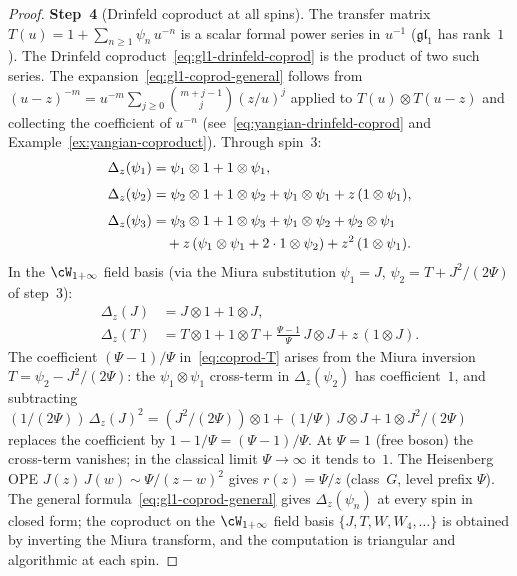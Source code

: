\begin{proof}
\medskip
\noindent
\textbf{Step~4}
(Drinfeld coproduct at all spins).
The transfer matrix
$T(u) = 1 + \sum_{n \geq 1} \psi_n\, u^{-n}$
is a scalar formal power series in $u^{-1}$
($\mathfrak{gl}_1$ has rank~$1$). The Drinfeld
coproduct~\eqref{eq:gl1-drinfeld-coprod} is the product
of two such series. The
expansion~\eqref{eq:gl1-coprod-general} follows from
$(u - z)^{-m} = u^{-m} \sum_{j \geq 0}
\binom{m+j-1}{j} (z/u)^j$ applied to
$T(u) \otimes T(u-z)$ and collecting the coefficient
of $u^{-n}$
(see~\eqref{eq:yangian-drinfeld-coprod} and
Example~\ref{ex:yangian-coproduct}).
Through spin~$3$:
\begin{align}
  \Delta_z(\psi_1)
  &= \psi_1 \otimes 1
  + 1 \otimes \psi_1,
  \label{eq:coprod-psi1} \\[4pt]
  \Delta_z(\psi_2)
  &= \psi_2 \otimes 1
  + 1 \otimes \psi_2
  + \psi_1 \otimes \psi_1
  + z\,(1 \otimes \psi_1),
  \label{eq:coprod-psi2} \\[4pt]
  \Delta_z(\psi_3)
  &= \psi_3 \otimes 1
  + 1 \otimes \psi_3
  + \psi_1 \otimes \psi_2
  + \psi_2 \otimes \psi_1
  \notag \\
  &\quad
  + z\,(\psi_1 \otimes \psi_1
  + 2 \cdot 1 \otimes \psi_2)
  + z^2\,(1 \otimes \psi_1).
  \label{eq:coprod-psi3}
\end{align}
In the $\cW_{1+\infty}$ field basis (via the Miura
substitution $\psi_1 = J$,
$\psi_2 = T + J^2/(2\Psi)$ of step~3):
\begin{align}
  \Delta_z(J)
  &= J \otimes 1
  + 1 \otimes J,
  \label{eq:coprod-J} \\[4pt]
  \Delta_z(T)
  &= T \otimes 1
  + 1 \otimes T
  + \tfrac{\Psi - 1}{\Psi}\, J \otimes J
  + z\,(1 \otimes J).
  \label{eq:coprod-T}
\end{align}
The coefficient $(\Psi - 1)/\Psi$ in~\eqref{eq:coprod-T}
arises from the Miura inversion $T = \psi_2 - J^2/(2\Psi)$:
the $\psi_1 \otimes \psi_1$ cross-term in
$\Delta_z(\psi_2)$ has coefficient~$1$, and
subtracting $(1/(2\Psi))\,\Delta_z(J)^2
= (J^2/(2\Psi)) \otimes 1 + (1/\Psi)\,J \otimes J
+ 1 \otimes J^2/(2\Psi)$
replaces the coefficient by $1 - 1/\Psi = (\Psi - 1)/\Psi$.
At $\Psi = 1$ (free boson) the cross-term vanishes;
in the classical limit $\Psi \to \infty$ it tends to~$1$.
The Heisenberg OPE
$J(z)\,J(w) \sim \Psi/(z-w)^2$ gives
$r(z) = \Psi/z$ (class~$G$, level prefix $\Psi$).
The general formula~\eqref{eq:gl1-coprod-general} gives
$\Delta_z(\psi_n)$ at every spin in closed form; the
coproduct on the $\cW_{1+\infty}$ field basis
$\{J, T, W, W_4, \ldots\}$ is obtained by inverting
the Miura transform, and the computation is triangular
and algorithmic at each spin.


\end{proof}
